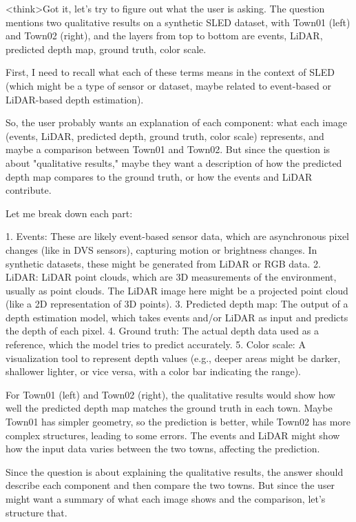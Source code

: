 <think>Got it, let's try to figure out what the user is asking. The question mentions two qualitative results on a synthetic SLED dataset, with Town01 (left) and Town02 (right), and the layers from top to bottom are events, LiDAR, predicted depth map, ground truth, color scale. 

First, I need to recall what each of these terms means in the context of SLED (which might be a type of sensor or dataset, maybe related to event-based or LiDAR-based depth estimation). 

So, the user probably wants an explanation of each component: what each image (events, LiDAR, predicted depth, ground truth, color scale) represents, and maybe a comparison between Town01 and Town02. But since the question is about "qualitative results," maybe they want a description of how the predicted depth map compares to the ground truth, or how the events and LiDAR contribute.

Let me break down each part:

1. Events: These are likely event-based sensor data, which are asynchronous pixel changes (like in DVS sensors), capturing motion or brightness changes. In synthetic datasets, these might be generated from LiDAR or RGB data.
2. LiDAR: LiDAR point clouds, which are 3D measurements of the environment, usually as point clouds. The LiDAR image here might be a projected point cloud (like a 2D representation of 3D points).
3. Predicted depth map: The output of a depth estimation model, which takes events and/or LiDAR as input and predicts the depth of each pixel.
4. Ground truth: The actual depth data used as a reference, which the model tries to predict accurately.
5. Color scale: A visualization tool to represent depth values (e.g., deeper areas might be darker, shallower lighter, or vice versa, with a color bar indicating the range).

For Town01 (left) and Town02 (right), the qualitative results would show how well the predicted depth map matches the ground truth in each town. Maybe Town01 has simpler geometry, so the prediction is better, while Town02 has more complex structures, leading to some errors. The events and LiDAR might show how the input data varies between the two towns, affecting the prediction.

Since the question is about explaining the qualitative results, the answer should describe each component and then compare the two towns. But since the user might want a summary of what each image shows and the comparison, let's structure that.

